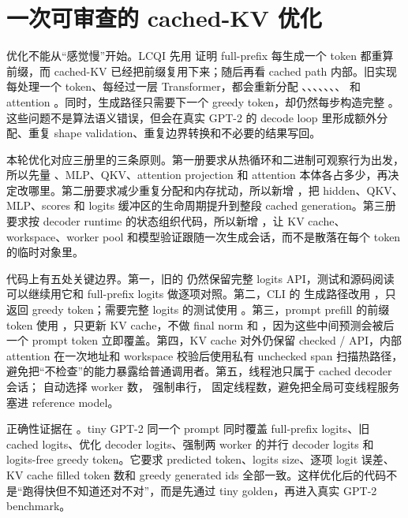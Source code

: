 \section{一次可审查的 cached-KV 优化}

优化不能从“感觉慢”开始。LCQI 先用  证明 full-prefix 每生成一个 token 都重算前缀，而 cached-KV 已经把前缀复用下来；随后再看 cached path 内部。旧实现每处理一个 token、每经过一层 Transformer，都会重新分配 、、、、、、、 和 attention 。同时，生成路径只需要下一个 greedy token，却仍然每步构造完整 。这些问题不是算法语义错误，但会在真实 GPT-2 的 decode loop 里形成额外分配、重复 shape validation、重复边界转换和不必要的结果写回。

本轮优化对应三册里的三条原则。第一册要求从热循环和二进制可观察行为出发，所以先量 、MLP、QKV、attention projection 和 attention 本体各占多少，再决定改哪里。第二册要求减少重复分配和内存扰动，所以新增 ，把 hidden、QKV、MLP、scores 和 logits 缓冲区的生命周期提升到整段 cached generation。第三册要求按 decoder runtime 的状态组织代码，所以新增 ，让 KV cache、workspace、worker pool 和模型验证跟随一次生成会话，而不是散落在每个 token 的临时对象里。

代码上有五处关键边界。第一，旧的  仍然保留完整 logits API，测试和源码阅读可以继续用它和 full-prefix logits 做逐项对照。第二，CLI 的  生成路径改用 ，只返回 greedy token；需要完整 logits 的测试使用 。第三，prompt prefill 的前缀 token 使用 ，只更新 KV cache，不做 final norm 和 ，因为这些中间预测会被后一个 prompt token 立即覆盖。第四，KV cache 对外仍保留 checked / API，内部 attention 在一次地址和 workspace 校验后使用私有 unchecked span 扫描热路径，避免把“不检查”的能力暴露给普通调用者。第五，线程池只属于 cached decoder 会话； 自动选择 worker 数， 强制串行， 固定线程数，避免把全局可变线程服务塞进 reference model。

正确性证据在 。tiny GPT-2 同一个 prompt 同时覆盖 full-prefix logits、旧 cached logits、优化 decoder logits、强制两 worker 的并行 decoder logits 和 logits-free greedy token。它要求 predicted token、logits size、逐项 logit 误差、KV cache filled token 数和 greedy generated ids 全部一致。这样优化后的代码不是“跑得快但不知道还对不对”，而是先通过 tiny golden，再进入真实 GPT-2 benchmark。

